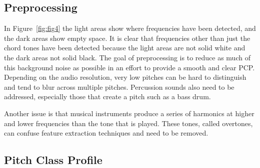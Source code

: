 \documentclass{sig-alternate}
\begin{document}
\subsection{Preprocessing}

In Figure~\ref{fig:fig4} the light areas show where frequencies have been detected, and the dark areas show empty space. It is clear that frequencies other than just the chord tones have been detected because the light areas are not solid white and the dark areas not solid black. The goal of preprocessing is to reduce as much of this background noise as possible in an effort to provide a smooth and clear PCP. Depending on the audio resolution, very low pitches can be hard to distinguish and tend to blur across multiple pitches. Percussion sounds also need to be addressed, especially those that create a pitch such as a bass drum.

Another issue is that musical instruments produce a series of harmonics at higher and lower frequencies than the tone that is played. These tones, called overtones, can confuse feature extraction techniques and need to be removed.



\subsection{Pitch Class Profile} 
\end{document}
